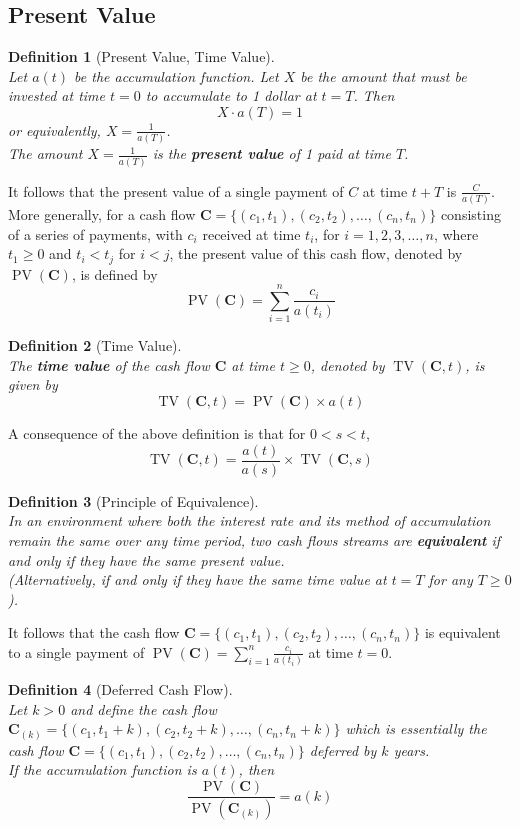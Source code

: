 \documentclass[12pt]{article}
\newtheorem{definition}{Definition}[section]
\theoremstyle{definition}
\DeclareMathOperator{\PV}{PV}
\DeclareMathOperator{\TV}{TV}
\newcommand\cf[1]{\mathbf{#1}}
\begin{document}
\subsection{Present Value}
\begin{definition}[Present Value, Time Value]
\hfill\\\normalfont Let $a(t)$ be the accumulation function. Let $X$ be the amount that must be invested at time $t=0$ to accumulate to 1 dollar at $t=T$. Then
\[
X\cdot a(T)=1
\]
or equivalently, $X= \frac{1}{a(T)}$.\\
The amount $X=\frac{1}{a(T)}$ is the \textbf{present value} of 1 paid at time $T$.
\end{definition}
It follows that the present value of a single payment of $C$ at time $t+T$ is $\frac{C}{a(T)}$.\\
More generally, for a cash flow $\cf{C} = \{(c_1,t_1),(c_2,t_2),\ldots,(c_n,t_n)\}$ consisting of a series of payments, with $c_i$ received at time $t_i$, for $i = 1,2 ,3,\ldots, n$, where $t_1\geq 0$ and $t_i<t_j$ for $i<j$, the present value of this cash flow, denoted by $\PV(\cf{C})$, is defined by
\[
\PV(\cf{C})=\sum_{i=1}^n\frac{c_i}{a(t_i)}
\] 
\begin{definition}[Time Value]
\hfill\\\normalfont The \textbf{time value} of the cash flow $\cf{C}$ at time $t\geq 0$, denoted by $\TV(\cf{C},t)$, is given by
\[
\TV(\cf{C},t) = \PV(\cf{C})\times a(t)
\]
\end{definition}
A consequence of the above definition is that for $0<s<t$,
\[
\TV(\cf{C},t)=\frac{a(t)}{a(s)}\times\TV(\cf{C},s)
\]
\begin{definition}[Principle of Equivalence]
\hfill\\\normalfont In an environment where both the \textit{interest rate} and its \textit{method of accumulation} remain the same over any time period, two cash flows streams are \textbf{equivalent} if and only if they have the same present value.\\(Alternatively, if and only if they have the same time value at $t=T$ for any $T\geq 0$).
\end{definition}
It follows that the cash flow $\cf{C}=\{(c_1,t_1),(c_2,t_2),\ldots,(c_n,t_n)\}$ is equivalent to a single payment of $\PV(\cf{C})=\sum_{i=1}^n\frac{c_i}{a(t_i)}$ at time $t=0$.
\begin{definition}[Deferred Cash Flow]
\hfill\\\normalfont Let $k>0$ and define the cash flow $\cf{C}_{(k)}=\{(c_1,t_1+k),(c_2,t_2+k),\ldots,(c_n,t_n+k)\}$ which is essentially the cash flow $\cf{C} = \{(c_1,t_1),(c_2,t_2),\ldots,(c_n,t_n)\}$ deferred by $k$ years.\\
If the accumulation function is $a(t)$, then
\[
\frac{\PV(\cf{C})}{\PV(\cf{C}_{(k)})}=a(k)
\]
\end{definition}
\end{document}
